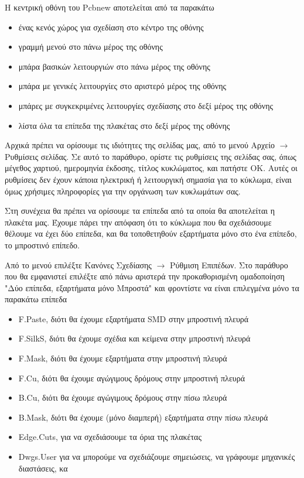 \documentclass[a4paper]{article}
\begin{document}
H κεντρική οθόνη του \textenglish{Pcbnew} αποτελείται από τα παρακάτω
\begin{itemize}
    \item ένας κενός χώρος για σχεδίαση στο κέντρο της οθόνης
    \item γραμμή μενού στο πάνω μέρος της οθόνης
    \item μπάρα βασικών λειτουργιών στο πάνω μέρος της οθόνης
    \item μπάρα με γενικές λειτουργίες στο αριστερό μέρος της οθόνης
    \item μπάρες με συγκεκριμένες λειτουργίες σχεδίασης στο δεξί μέρος της οθόνης
    \item λίστα όλα τα επίπεδα της πλακέτας στο δεξί μέρος της οθόνης
\end{itemize}

Αρχικά πρέπει να ορίσουμε τις ιδιότητες της σελίδας μας, από το μενού Αρχείο $\rightarrow$ Ρυθμίσεις σελίδας. Σε αυτό το παράθυρο, ορίστε τις ρυθμίσεις της σελίδας σας, όπως μέγεθος χαρτιού, ημερομηνία έκδοσης, τίτλος κυκλώματος, και πατήστε ΟΚ. Αυτές οι ρυθμίσεις δεν έχουν κάποια ηλεκτρική ή λειτουργική σημασία για το κύκλωμα, είναι όμως χρήσιμες πληροφορίες για την οργάνωση των κυκλωμάτων σας.

\begin{figure}
  \begin{center}
    \label{fig:kicad-main}
  \end{center}
\end{figure}

Στη συνέχεια θα πρέπει να ορίσουμε τα επίπεδα από τα οποία θα αποτελείται η πλακέτα μας. Έχουμε πάρει την απόφαση ότι το κύκλωμα που θα σχεδιάσουμε θέλουμε να έχει δύο επίπεδα, και θα τοποθετηθούν εξαρτήματα μόνο στο ένα επίπεδο, το μπροστινό επίπεδο. 

Από το μενού επιλέξτε Κανόνες Σχεδίασης $\rightarrow$ Ρύθμιση Επιπέδων. Στο παράθυρο που θα εμφανιστεί επιλέξτε από πάνω αριστερά την προκαθορισμένη ομαδοποίηση "Δύο επίπεδα, εξαρτήματα μόνο Μπροστά" και φροντίστε να είναι επιλεγμένα μόνο τα παρακάτω επίπεδα
\begin{itemize}
    \item F.Paste, διότι θα έχουμε εξαρτήματα SMD στην μπροστινή πλευρά
    \item F.SilkS, διότι θα έχουμε σχέδια και κείμενα στην μπροστινή πλευρά
    \item F.Mask, διότι θα έχουμε εξαρτήματα στην μπροστινή πλευρά
    \item F.Cu, διότι θα έχουμε αγώγιμους δρόμους στην μπροστινή πλευρά
    \item B.Cu, διότι θα έχουμε αγώγιμους δρόμους στην πίσω πλευρά
    \item B.Mask, διότι θα έχουμε (μόνο διαμπερή) εξαρτήματα στην πίσω πλευρά
    \item Edge.Cuts, για να σχεδιάσουμε τα όρια της πλακέτας
    \item Dwgs.User για να μπορούμε να σχεδιάζουμε σημειώσεις, να γράφουμε μηχανικές διαστάσεις, κα
\end{itemize}
\end{document}
